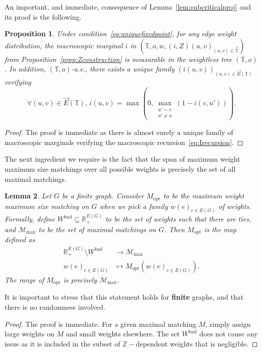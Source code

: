 \documentclass[11pt]{article}
\newtheorem{prop}{Proposition}[section]
\newtheorem{lemma}[prop]{Lemma}
\begin{document}
An important, and immediate, consequence of Lemma~\ref{lem:subcriticalproj} and its proof is the following.

\begin{prop} \label{prop:ilocal}
    Under condition~\ref{eq:uniquefixedpoint}, for any edge weight distribution, the macroscopic marginal $i$ in $\left(\mathbb{T},o,w,(i,Z)(u,v)_{(u,v)\in \overset{\rightarrow}{\mathbb{T}}}\right)$ from Proposition~\ref{prop:Zconstruction} is measurable in the weightless tree $(\mathbb{T},o)$.  In addition, $(\mathbb{T},o)$-\emph{a.e.}, there exists a unique family $(i(u,v))_{(u,v)\in\overset{\rightarrow}{E}(\mathbb{T})}$ verifying
    \begin{equation}\label{eq:Irecursion}
        \forall (u,v) \in \overset{\rightarrow}{E}(\mathbb{T}) , \, i(u,v)=\max\left(0,\max_{\substack{u' \sim v \\ u'\neq u }} (1-i(v,u')) \right).
    \end{equation}
\end{prop}
\begin{proof}
    The proof is immediate as there is almost surely a unique family of macroscopic marginals verifying the macroscopic recursion~\eqref{eq:Irecursion}.
\end{proof}

\bigskip

The next ingredient we require is the fact that the span of maximum weight maximum size matchings over all possible weights is precisely the set of all maximal matchings.
\begin{lemma}\label{lem:iidmax}
    Let $G$ be a finite graph. Consider $M_{\mathrm{opt}}$ to be the maximum weight maximum size matching on $G$ when we pick a family $w(e)_{e \in E(G)}$ of weights. Formally, define $W^{\mathrm{bad}}\subseteq \mathbb{R}_+^{E(G)}$ to be the set of weights such that there are ties, and $\mathcal{M}_{\mathrm{max}}$ to be the set of maximal matchings on $G$. Then $M_{\mathrm{opt}}$ is the map defined as
    \begin{align*}
        \mathbb{R}_+^{E(G)} \setminus W^{\mathrm{bad}} &\to \mathcal{M}_{\max} \\
        w(e)_{e \in E(G)} &\mapsto M_{\mathrm{opt}}(w(e)_{e \in E(G)}).
    \end{align*}
     The range of $M_{\mathrm{opt}}$ is precisely $\mathcal{M}_{\max}$.
\end{lemma}
\begin{remark}
    It is important to stress that this statement holds for \textbf{finite} graphs, and that there is no randomness involved.
\end{remark}
\begin{proof}
The proof is immediate. For a given maximal matching $M$, simply assign large weights on $M$ and small weights elsewhere. The set $W^{\mathrm{bad}}$ does not cause any issue as it is included in the subset of $\mathbb{Z}-$dependent weights that is negligible.
\end{proof}
\end{document}
